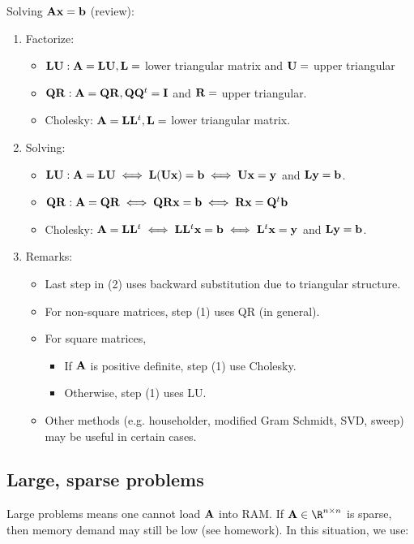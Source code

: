 \documentclass[./some_latex_template.tex]{subfiles}
\begin{document}
Solving $\mathbf{A} \mathbf{x} = \mathbf{b}$ (review):

\begin{enumerate}
	\item Factorize: 
		\begin{itemize}
			\item $\mathbf{L}\mathbf{U}: \mathbf{A} = \mathbf{L}\mathbf{U}, \mathbf{L} =$ lower triangular matrix and $\mathbf{U} =$ upper triangular
			\item $\mathbf{Q}\mathbf{R}: \mathbf{A} = \mathbf{Q}\mathbf{R}, \mathbf{Q}\mathbf{Q}^t = \mathbf{I}$ and $\mathbf{R} =$ upper triangular. 
			\item Cholesky: $\mathbf{A} = \mathbf{L}\mathbf{L}^t, \mathbf{L} =$ lower triangular matrix.
		\end{itemize}
	\item Solving:
		\begin{itemize}
			\item $\mathbf{L}\mathbf{U}: \mathbf{A} = \mathbf{L}\mathbf{U} \iff \mathbf{L}(\mathbf{U}\mathbf{x}) = \mathbf{b} \iff \mathbf{U}\mathbf{x} = \mathbf{y}$ and $\mathbf{L}\mathbf{y} = \mathbf{b}$.
			\item $\mathbf{Q}\mathbf{R}: \mathbf{A} = \mathbf{Q}\mathbf{R} \iff \mathbf{Q}\mathbf{R}\mathbf{x} = \mathbf{b} \iff \mathbf{R}\mathbf{x} = \mathbf{Q}^t\mathbf{b}$
			\item Cholesky: $\mathbf{A} = \mathbf{L}\mathbf{L}^t \iff \mathbf{L}\mathbf{L}^t\mathbf{x} = \mathbf{b} \iff \mathbf{L}^t\mathbf{x} = \mathbf{y}$ and $\mathbf{L}\mathbf{y} = \mathbf{b}$. 
		\end{itemize}
	\item Remarks:
		\begin{itemize}
			\item Last step in (2) uses backward substitution due to triangular structure. 
			\item For non-square matrices, step (1) uses QR (in general).
			\item For square matrices, 
				\begin{itemize}
					\item If $\mathbf{A}$ is positive definite, step (1) use Cholesky.
					\item Otherwise, step (1) uses LU. 
				\end{itemize}
			\item Other methods (e.g. householder, modified Gram Schmidt, SVD, sweep) may be useful in certain cases. 
		\end{itemize}
\end{enumerate}

\subsection{Large, sparse problems}

Large problems means one cannot load $\mathbf{A}$ into RAM. If $\bA \in \R^{n \times n}$ is sparse, then memory demand may still be low (see homework). In this situation, we use:
\end{document}
